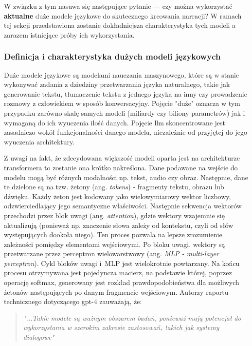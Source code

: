 W związku z tym nasuwa się następujące pytanie --- czy można wykorzystać \textbf{aktualne} duże modele
językowe do skutecznego kreowania narracji? W ramach tej sekcji przedstawiona zostanie dokładniejsza
charakterystyka tych modeli a zarazem istniejące próby ich wykorzystania.

\subsubsection*{Definicja i charakterystyka dużych modeli językowych}

Duże modele językowe są modelami nauczania maszynowego, które są w stanie wykonywać zadania z dziedziny
przetwarzania języka naturalnego, takie jak generowanie tekstu, tłumaczenie tekstu z jednego języka
na inny czy prowadzenie rozmowy z człowiekiem w sposób konwersacyjny\cite{larp_language}. Pojęcie
"duże" oznacza w tym przypadku zarówno skalę samych modeli (miliardy czy biliony parametrów) jak i
wymaganą do ich wyuczenia ilość danych. Pojęcie \gls{llm} skoncentrowane jest zasadniczo wokół funkcjonalności
danego modelu, niezależnie od przyjętej do jego wyuczenia architektury.

Z uwagi na fakt, że zdecydowana większość modeli oparta jest na architekturze transformera to zostanie
ona krótko nakreślona. Dane podawane na wejście do modelu mogą być różnych modalności np. tekst,
audio czy obraz. Następnie, dane te dzielone są na tzw. żetony (ang. \textit{tokens}) - fragmenty tekstu,
obrazu lub dźwięku. Każdy żeton jest kodowany jako wielowymiarowy wektor liczbowy, odzwierciedlający
jego semantyczne właściwości. Następnie sekwencja wektorów przechodzi przez blok uwagi (ang.
\textit{attention}), gdzie wektory wzajemnie się aktualizują (ponieważ np. znaczenie słowa zależy od
kontekstu, czyli od słów występujących dookoła niego). Ten proces pozwala na lepsze zrozumienie
zależności pomiędzy elementami wejściowymi. Po bloku uwagi, wektory są przetwarzane przez
perceptron wielowarstwowy (ang. \textit{MLP - multi-layer perceptron}). Cykl bloków uwagi i~MLP jest
wielokrotnie powtarzany. Na końcu procesu otrzymywana jest pojedyncza macierz, na podstawie której, poprzez
operację softmax, generowany jest rozkład prawdopodobieństwa dla możliwych żetonów następujących po
danym fragmencie wejściowym. Autorzy raportu technicznego dotyczącego \gls{gpt}-4 zauważają, że:

\begin{quote}
    \textit{"...Takie modele są ważnym obszarem badań, ponieważ mają potencjał do wykorzystania w szerokim
        zakresie zastosowań, takich jak systemy dialogowe"}\cite{openai2024gpt4}
\end{quote}


